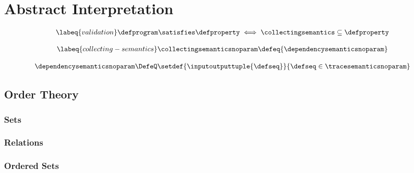 


\setchapterpreamble[u]{\margintoc}



\chapter{Abstract Interpretation}


\begin{definition}[Validation]
  \begin{align}
    \labeq{validation}
    \defprogram \satisfies \defproperty \iff \collectingsemantics \subseteq \defproperty
  \end{align}
\end{definition}

\begin{definition}
  \begin{align}
    \labeq{collecting-semantics}
    \collectingsemanticsnoparam \defeq \{ \dependencysemanticsnoparam \}
  \end{align}
\end{definition}

\begin{definition}
  \begin{align*}
    \dependencysemanticsnoparam \DefeQ \setdef{\inputoutputtuple{\defseq}}{\defseq\in\tracesemanticsnoparam}
  \end{align*}
\end{definition}


\section{Order Theory}

\subsection{Sets}

\subsection{Relations}

\subsection{Ordered Sets}

